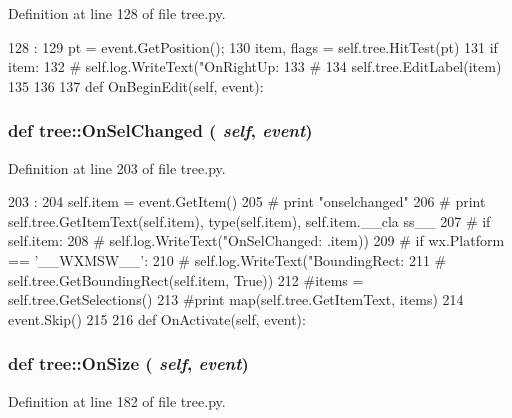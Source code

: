 Definition at line 128 of file tree.py.


\begin{DoxyCode}
128                               :
129         pt = event.GetPosition();
130         item, flags = self.tree.HitTest(pt)
131         if item:        
132 #            self.log.WriteText("OnRightUp: %
133 #                               %
134             self.tree.EditLabel(item)
135 
136 
137 
    def OnBeginEdit(self, event):
\end{DoxyCode}
\hypertarget{namespacetree_aa2ac43e21497dad4a166aed75c04e5d3}{
\subsubsection[{OnSelChanged}]{\setlength{\rightskip}{0pt plus 5cm}def tree::OnSelChanged ( {\em self}, \/   {\em event})}}
\label{namespacetree_aa2ac43e21497dad4a166aed75c04e5d3}


Definition at line 203 of file tree.py.


\begin{DoxyCode}
203                                  :
204         self.item = event.GetItem()
205 #        print "onselchanged"
206 #        print self.tree.GetItemText(self.item), type(self.item), self.item.__cla
      ss__
207 #        if self.item:
208 #            self.log.WriteText("OnSelChanged: %
      .item))
209 #            if wx.Platform == '__WXMSW__':
210 #                self.log.WriteText("BoundingRect: %
211 #                                   self.tree.GetBoundingRect(self.item, True))
212             #items = self.tree.GetSelections()
213             #print map(self.tree.GetItemText, items)
214         event.Skip()
215 
216 
    def OnActivate(self, event):
\end{DoxyCode}
\hypertarget{namespacetree_ac72bcd6136af4eea9dc06cfee1f1d24a}{
\subsubsection[{OnSize}]{\setlength{\rightskip}{0pt plus 5cm}def tree::OnSize ( {\em self}, \/   {\em event})}}
\label{namespacetree_ac72bcd6136af4eea9dc06cfee1f1d24a}


Definition at line 182 of file tree.py.


